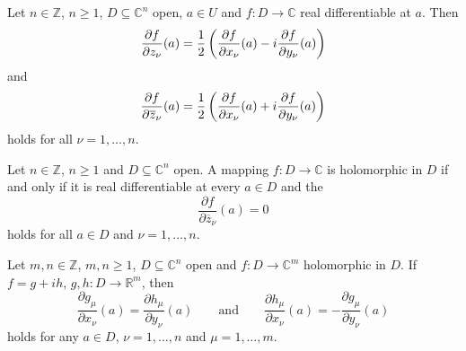 \begin{proposition}
Let $n \in \mathbb{Z}$, $n \geq 1$, $D \subseteq \mathbb{C}^n$ open, $a \in U$ and $f : D \to \mathbb{C}$ real differentiable at $a$. Then
\begin{equation}
\frac{\partial f}{\partial z_\nu}(a) = \frac{1}{2}\del[3]{\frac{\partial f}{\partial x_\nu}(a) - i \frac{\partial f}{\partial y_\nu}(a)} 
\end{equation}
\noindent and
\begin{equation}
\frac{\partial f}{\partial \overline{z}_\nu}(a) = \frac{1}{2}\del[3]{\frac{\partial f}{\partial x_\nu}(a) + i \frac{\partial f}{\partial y_\nu}(a)}
\end{equation}  
\noindent holds for all $\nu = 1,\dots,n$.
\label{prop:Wirtinger}
\end{proposition}

\begin{theorem}
Let $n \in \mathbb{Z}$, $n \geq 1$ and $D \subseteq \mathbb{C}^n$ open. A mapping $f: D \to \mathbb{C}$ is holomorphic in $D$ if and only if it is real differentiable at every $a \in D$ and the 
\begin{equation}
\frac{\partial f}{\partial \overline{z}_\nu}(a) = 0 
\end{equation}
\noindent holds for all $a \in D$ and $\nu = 1,\dots,n$.
\label{thm:CR}
\end{theorem}

\begin{corollary}
Let $m,n \in \mathbb{Z}$, $m,n \geq 1$, $D \subseteq \mathbb{C}^n$ open and $f: D \to \mathbb{C}^m$ holomorphic in $D$. If $f = g + ih$, $g,h : D \to \mathbb{R}^m$, then 
\begin{equation}
\boxed{\frac{\partial g_\mu}{\partial x_\nu}(a) = \frac{\partial h_\mu}{\partial y_\nu}(a) \qquad \text{and} \qquad \frac{\partial h_\mu}{\partial x_\nu}(a) = -\frac{\partial g_\mu}{\partial y_\nu}(a)}
\end{equation} 
\noindent holds for any $a \in D$, $\nu = 1,\dots,n$ and $\mu = 1,\dots,m$.
\label{cor:CRreal}
\end{corollary}

